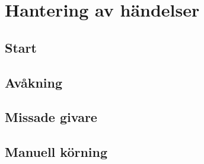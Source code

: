 \section{Hantering av händelser}

\subsection{Start} 

\subsection{Avåkning} 

\subsection{Missade givare} 

\subsection{Manuell körning}  
